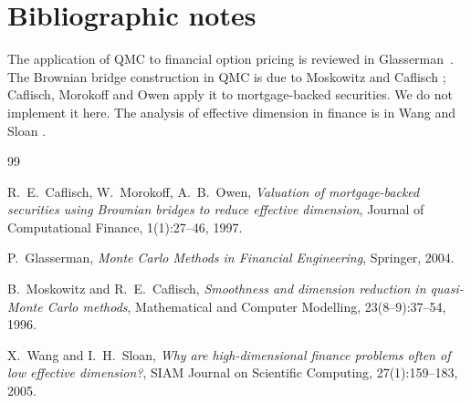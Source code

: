 \documentclass[11pt,a4paper]{article}
\theoremstyle{plain}
\theoremstyle{definition}
\theoremstyle{remark}
\begin{document}
\section{Bibliographic notes}
\label{sec:biblio}

The application of QMC to financial option pricing is reviewed in
Glasserman~\cite[Chapter~5]{Glasserman}. The Brownian bridge
construction in QMC is due to Moskowitz and Caflisch
\cite{MoskowitzCaflisch}; Caflisch, Morokoff and Owen
\cite{CaflischMorokoffOwen} apply it to mortgage-backed securities.
We do not implement it here. The
analysis of effective dimension in finance is in Wang and Sloan
\cite{WangSloan}.

\begin{thebibliography}{99}

R.\ E.\ Caflisch, W.\ Morokoff, A.\ B.\ Owen,
\emph{Valuation of mortgage-backed securities using Brownian
bridges to reduce effective dimension},
Journal of Computational Finance, 1(1):27--46, 1997.

P.\ Glasserman,
\emph{Monte Carlo Methods in Financial Engineering},
Springer, 2004.

B.\ Moskowitz and R.\ E.\ Caflisch,
\emph{Smoothness and dimension reduction in quasi-Monte Carlo
methods},
Mathematical and Computer Modelling, 23(8--9):37--54, 1996.

X.\ Wang and I.\ H.\ Sloan,
\emph{Why are high-dimensional finance problems often of low
effective dimension?},
SIAM Journal on Scientific Computing, 27(1):159--183, 2005.

\end{thebibliography}
\end{document}
